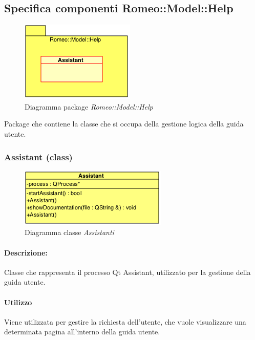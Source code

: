 \color{black}
\subsection{Specifica componenti Romeo::Model::Help}
\label{specificaHelp}

	\begin{figure}[!h]
				\centering
				\includegraphics[scale=1.00]{../Specifica_Tecnica/Content/Immagini/Help.png}
				\caption{Diagramma package \textsl{Romeo::Model::Help}}
				\label{comp_romeo::model::help}
	\end{figure}
	
Package\g{} che contiene la classe che si occupa della gestione logica della guida utente.
	\subsubsection{Assistant (class)}
	\label{spehelp}
	\begin{figure}[!h]
	\centering
				\includegraphics[width=0.6\linewidth]{./Content/Immagini/model/Assistant.png}
				\caption{Diagramma classe \textsl{Assistanti}}
				\label{cl_log}
	\end{figure}

	\paragraph{Descrizione:\\}
	 Classe che rappresenta il processo Qt Assistant, utilizzato per la gestione della guida utente.
	
	\paragraph{Utilizzo\\} 
	Viene utilizzata per gestire la richiesta dell'utente, che vuole visualizzare una determinata pagina all'interno della guida utente.
					

